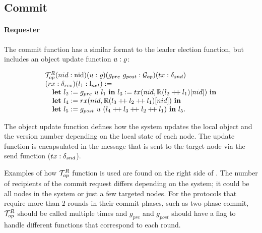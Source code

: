 \subsection{Commit}
\label{subsec:commit}

\paragraph{Requester}
The commit function has a similar format to the leader election function, but
includes an object update function $u : \varrho$:
\begin{small}
$$
\begin{array}{l}
\opfunction (nid: \nodeid) (u : \updatefunc) (g_{pre}\ g_{post}:  \gopfunction)
	(tx: \sendfunction)\\
	(rx: \recvfunction)
	(l_1  :\networklog ) := \\
\ \ \ \mbox{\textbf{let}} \ l_2 := g_{pre}\ u \ l_1  \ \mbox{\textbf{in}}\   l_3 := tx(nid, \replay(l_2 \mdoubleplus l_1)[nid]) \ \mbox{\textbf{in}}  \\
\ \ \ \mbox{\textbf{let}} \ l_4 := rx(nid, \replay(l_3 \mdoubleplus l_2 \mdoubleplus l_1)[nid]) \
	\mbox{\textbf{in}} \\
\ \ \ \mbox{\textbf{let}} \ l_5 := 	 g_{post}\  u \ (l_4 \mdoubleplus l_3 \mdoubleplus l_2 \mdoubleplus l_1) \ \mbox{\textbf{in}}\ l_5.
\end{array}
$$
\end{small}
The object update function defines how the system updates the local object and
the version number depending on the local state of each node.
The update function is encapsulated in the message that is sent to the target node
via the send function ($tx : \delta_{snd}$).

Examples of how $\mathcal{T}^{R}_{op}$ function is used are found on the right side
of \pref{fig:process-flow}. The number of recipients of the commit request differs depending
on the system; it could be all nodes in the system or just a few targeted nodes.
For the protocols that require more than 2 rounds in their commit phases, such as 
two-phase commit, $\mathcal{T}^{R}_{op}$ should be called multiple times and $g_{pre}$ and
$g_{post}$ should have a flag to handle different functions that correspond to
each round. 

